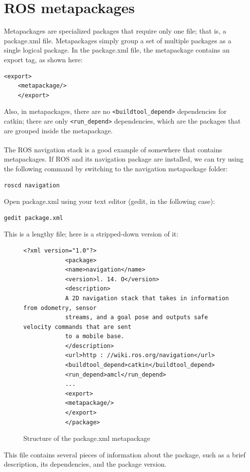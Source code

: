 \documentclass[../../main]{subfiles}
\begin{document}
\section{ROS metapackages}
Metapackages are specialized packages that require only one file; that is, a package.xml
file.
Metapackages simply group a set of multiple packages as a single logical package. In the
package.xml file, the metapackage contains an export tag, as shown here:
\begin{lstlisting}[style=xmlstyle]
    <export>
    <metapackage/>
    </export>
\end{lstlisting}
Also, in metapackages, there are no \texttt{<buildtool\_depend>} dependencies for catkin;
there are only \texttt{<run\_depend>} dependencies, which are the packages that are grouped
inside the metapackage.\\
\\
The ROS navigation stack is a good example of somewhere that contains metapackages. If
ROS and its navigation package are installed, we can try using the following command by
switching to the navigation metapackage folder:
\begin{lstlisting}[language=bash, frame=shadowbox]
    roscd navigation
    \end{lstlisting}
    Open package.xml using your text editor (gedit, in the following case):
    \begin{lstlisting}[language=bash, frame=shadowbox]
    gedit package.xml
        \end{lstlisting}
    \newpage
        This is a lengthy file; here is a stripped-down version of it:
\begin{figure}[ht]
        \begin{lstlisting}[style=xmlstyle]
            <?xml version="1.0"?>
            <package>
            <name>navigation</name>
            <version>l. 14. O</version>
            <description>
            A 2D navigation stack that takes in information from odometry, sensor
            streams, and a goal pose and outputs safe velocity commands that are sent
            to a mobile base.
            </description>
            <url>http : //wiki.ros.org/navigation</url>
            <buildtool_depend>catkin</buildtool_depend>
            <run_depend>amcl</run_depend>
            ...
            <export>
            <metapackage/>
            </export>
            </package>
        \end{lstlisting}
        \caption{Structure of the package.xml metapackage}
    \end{figure}
    This file contains several pieces of information about the package, such as a brief
description, its dependencies, and the package version.
\end{document}
